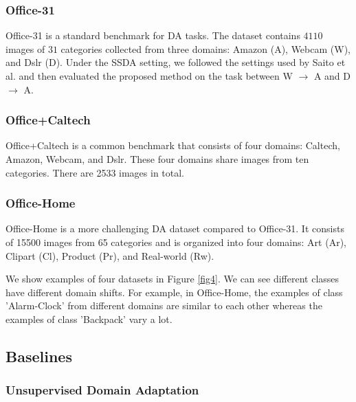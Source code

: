 \documentclass[a4paper,fleqn]{cas-dc}
\begin{document}
	\subsubsection{Office-31} Office-31 \cite{saenko2010adapting} is a standard benchmark for DA tasks. The dataset contains $4110$ images of $31$ categories collected from three domains: Amazon (A), Webcam (W), and Dslr (D). Under the SSDA setting, we followed the settings used by Saito et al. \cite{saito2019semi} and then evaluated the proposed method on the task between W $\rightarrow$ A and D $\rightarrow$ A.
	
	{\subsubsection{Office+Caltech}
		Office+Caltech \cite{gong2012geodesic} is a common benchmark that consists of four domains: Caltech, Amazon, Webcam, and Dslr. These four domains share images from ten categories. There are 2533 images in total.}
	
	\subsubsection{Office-Home} Office-Home \cite{venkateswara2017deep} is a more challenging DA dataset compared to Office-31. It consists of 15500 images from 65 categories and is organized into four domains: Art (Ar), Clipart (Cl), Product (Pr), and Real-world (Rw).
	
	We show examples of four datasets in Figure \ref{fig4}. We can see different classes have different domain shifts. For example, in Office-Home, the examples of class 'Alarm-Clock' from different domains are similar to each other whereas the examples of class 'Backpack' vary a lot.
	
	
	\subsection{Baselines}
	\subsubsection{Unsupervised Domain Adaptation} 
	
\end{document}
